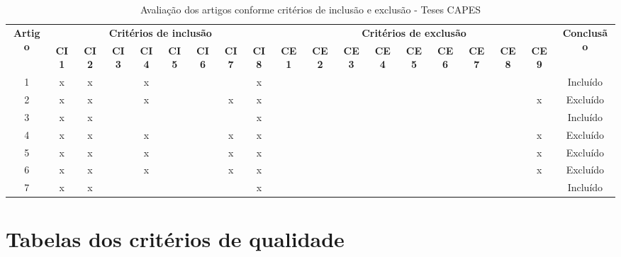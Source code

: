 \documentclass[
	12pt,				%
	oneside,			%
	a4paper,			%
	english,			%
	brazil				%
	]{abntex2ppgsi}
\begin{document}
\begin{apendicesenv}
\begin{table}[H]
\centering
\caption{Avaliação dos artigos conforme critérios de inclusão e exclusão - Teses CAPES}
\label{tab:crit_IncExc_TC}
\setlength{\tabcolsep}{1.5pt} %
\footnotesize %
\begin{tabular}{c | c c c c c c c c | c c c c c c c c c | c}
\toprule
    \multirow{2}{*}{\textbf{Artigo}} & 
    \multicolumn{8}{c|}{\textbf{Critérios de inclusão}} &
    \multicolumn{9}{c|}{\textbf{Critérios de exclusão}} &
    \multirow{2}{*}{\textbf{Conclusão}} \\ 
    \cline{2-18}
 & \tiny\textbf{CI1} & \tiny\textbf{CI2} & \tiny\textbf{CI3} & \tiny\textbf{CI4} & \tiny\textbf{CI5} & \tiny\textbf{CI6} & \tiny\textbf{CI7} & \tiny\textbf{CI8} & \tiny\textbf{CE1} & \tiny\textbf{CE2} & \tiny\textbf{CE3} & \tiny\textbf{CE4} & \tiny\textbf{CE5} & \tiny\textbf{CE6} & \tiny\textbf{CE7} & \tiny\textbf{CE8} & \tiny\textbf{CE9} & \\
\midrule
 1 & x & x &   & x &   &   &   & x &   &   &   &   &   &   &   &   &   & Incluído \\
 2 & x & x &   & x &   &   & x & x &   &   &   &   &   &   &   &   & x & Excluído \\
 3 & x & x &   &   &   &   &   & x &   &   &   &   &   &   &   &   &   & Incluído \\
 4 & x & x &   & x &   &   & x & x &   &   &   &   &   &   &   &   & x & Excluído \\
 5 & x & x &   & x &   &   & x & x &   &   &   &   &   &   &   &   & x & Excluído \\
 6 & x & x &   & x &   &   & x & x &   &   &   &   &   &   &   &   & x & Excluído \\
 7 & x & x &   &   &   &   &   & x &   &   &   &   &   &   &   &   &   & Incluído \\
\bottomrule
\end{tabular}
\end{table}


\chapter{Tabelas dos critérios de qualidade}\label{Apendice_C}


\end{apendicesenv}
\end{document}
